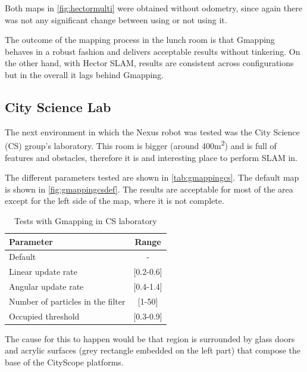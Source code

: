 Both maps in \autoref{fig:hectormulti} were obtained without odometry, since again there was not any significant change between using or not using it.

The outcome of the mapping process in the lunch room is that Gmapping behaves in a robust fashion and delivers acceptable results without tinkering. On the other hand, with Hector SLAM, results are consistent across configurations but in the overall it lags behind Gmapping.

\subsection{City Science Lab}
The next environment in which the Nexus robot was tested was the City Science (CS) group's laboratory. This room is bigger (around 400m\textsuperscript{2}) and is full of features and obstacles, therefore it is and interesting place to perform SLAM in.

 The different parameters tested are shown in \autoref{tab:gmappingcs}. The default map is shown in \autoref{fig:gmappingcsdef}. The results are acceptable for most of the area except for the left side of the map, where it is not complete.
\begin{table}[t]
  \centering
  \begin{tabular}{lc}
  \hline
    \textbf{Parameter} & \textbf{Range} \\ \hline
    Default & - \\ \hline
    Linear update rate & {[}0.2-0.6{]} \\ \hline
    Angular update rate & {[}0.4-1.4{]} \\ \hline
    Number of particles in the filter & {[}1-50{]} \\ \hline
    Occupied threshold & {[}0.3-0.9{]} \\ \hline
  \end{tabular}
  \caption{Tests with Gmapping in CS laboratory}
  \label{tab:gmappingcs}
\end{table}

The cause for this to happen would be that region is surrounded by glass doors and acrylic surfaces (grey rectangle embedded on the left part) that compose the base of the CityScope platforms.

